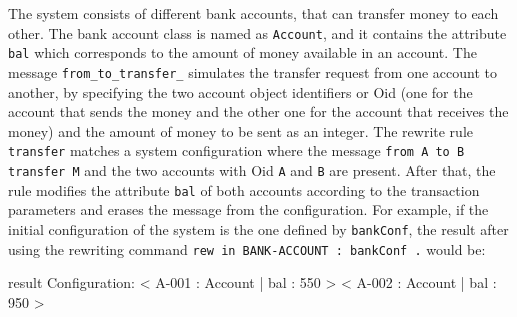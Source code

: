 The system consists of different bank accounts, that can transfer money to each other. The bank account class is named as \texttt{Account}, and it contains the attribute \texttt{bal} which corresponds to the amount of money available in an account. The message \texttt{from\_to\_transfer\_} simulates the transfer request from one account to another, by specifying the two account object identifiers or Oid (one for the account that sends the money and the other one for the account that receives the money) and the amount of money to be sent as an integer. The rewrite rule \texttt{transfer} matches a system configuration where the message \texttt{from A to B transfer M} and the two accounts with Oid \texttt{A} and \texttt{B} are present. After that, the rule modifies the attribute \texttt{bal} of both accounts according to the transaction parameters and erases the message from the configuration. For example, if the initial configuration of the system is the one defined by \texttt{bankConf}, the result after using the rewriting command \texttt{rew in BANK-ACCOUNT : bankConf .} would be:
\\
\begin{maude2}
result Configuration: < A-001 : Account | bal : 550 > 
                      < A-002 : Account | bal : 950 >
\end{maude2}

